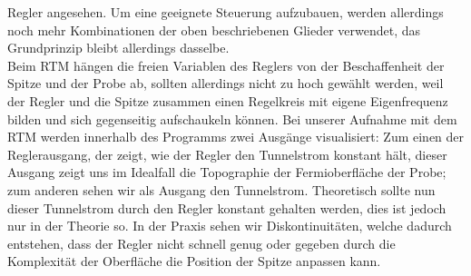 Regler angesehen. Um eine geeignete Steuerung aufzubauen, werden allerdings noch mehr Kombinationen
der oben beschriebenen Glieder verwendet, das Grundprinzip bleibt allerdings dasselbe.\\
Beim RTM hängen die freien Variablen des Reglers von der Beschaffenheit der Spitze und der Probe
ab, sollten allerdings nicht zu hoch gewählt werden, weil der Regler und die Spitze zusammen
einen Regelkreis mit eigene Eigenfrequenz bilden und sich gegenseitig aufschaukeln können.
Bei unserer Aufnahme mit dem RTM werden innerhalb des Programms zwei Ausgänge visualisiert:
Zum einen der Reglerausgang, der zeigt, wie der Regler den Tunnelstrom konstant hält, dieser
Ausgang zeigt uns im Idealfall die Topographie der Fermioberfläche der Probe; zum anderen sehen
wir als Ausgang den Tunnelstrom. Theoretisch sollte nun dieser Tunnelstrom durch den Regler
konstant gehalten werden, dies ist jedoch nur in der Theorie so. In der Praxis sehen wir
Diskontinuitäten, welche dadurch entstehen, dass der Regler nicht schnell genug oder gegeben
durch die Komplexität der Oberfläche die Position der Spitze anpassen kann.

